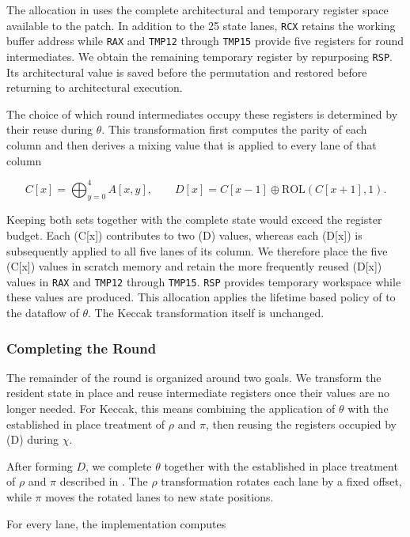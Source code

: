 \documentclass[journal=tches,submission]{iacrtrans}
\newcommand{\code}[1]{\texttt{#1}}
\begin{document}
The allocation in  uses the complete architectural and temporary register space available to the patch. 
In addition to the 25 state lanes, \code{RCX} retains the working buffer address while \code{RAX} and \code{TMP12} through \code{TMP15} provide five registers for round intermediates. 
We obtain the remaining temporary register by repurposing \code{RSP}. 
Its architectural value is saved before the permutation and restored before returning to architectural execution.

The choice of which round intermediates occupy these registers is determined by their reuse during $\theta$. 
This transformation first computes the parity of each column and then derives a mixing value that is applied to every lane of that column

\[
C[x] = \bigoplus_{y=0}^{4} A[x,y],
\qquad
D[x] = C[x-1] \oplus \mathrm{ROL}(C[x+1],1).
\]

Keeping both sets together with the complete state would exceed the register budget. 
Each (C[x]) contributes to two (D) values, whereas each (D[x]) is subsequently applied to all five lanes of its column. 
We therefore place the five (C[x]) values in scratch memory and retain the more frequently reused (D[x]) values in \code{RAX} and \code{TMP12} through \code{TMP15}. 
\code{RSP} provides temporary workspace while these values are produced.
This allocation applies the lifetime based policy of  to the dataflow of $\theta$. 
The Keccak transformation itself is unchanged.

\subsubsection{Completing the Round}
\label{sec:cyclewalk}

The remainder of the round is organized around two goals. 
We transform the resident state in place and reuse intermediate registers once their values are no longer needed.
For Keccak, this means combining the application of $\theta$ with the established in place treatment of $\rho$ and $\pi$, then reusing the registers occupied by (D) during $\chi$.

After forming \(D\), we complete \(\theta\) together with the established in place treatment of \(\rho\) and \(\pi\) described in . 
The \(\rho\) transformation rotates each lane by a fixed offset, while \(\pi\) moves the rotated lanes to new state positions.

For every lane, the implementation computes
\end{document}
